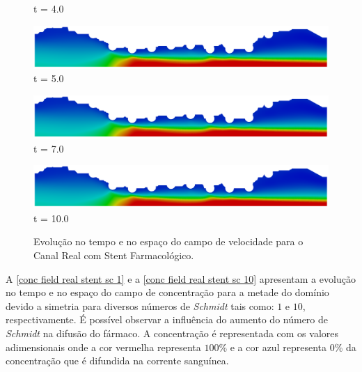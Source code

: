 \begin{figure}[H]
\begin{minipage}{.50\linewidth}
      t = 4.0
     \end{minipage}%
     \begin{minipage}{.50\linewidth}
      \centering
      \includegraphics[scale=0.12]{./02_chaps/cap_solution/figure/vel_RealStrut10000.png}\\
      t = 5.0
     \end{minipage}
     \begin{minipage}{.50\linewidth}
     \medskip
      \centering
      \includegraphics[scale=0.12]{./02_chaps/cap_solution/figure/vel_RealStrut14000.png}\\
      t = 7.0
     \end{minipage}%
     \begin{minipage}{.50\linewidth}
     \medskip
      \centering
      \includegraphics[scale=0.12]{./02_chaps/cap_solution/figure/vel_RealStrut20000.png}\\
      t = 10.0
     \end{minipage}
     \medskip
     \caption{Evolução no tempo e no espaço do campo de velocidade para o Canal Real com Stent Farmacológico.}
     \label{velocity field real stent}
\end{figure}

\vspace{1cm}
A \ref{conc field real stent sc 1} e a \ref{conc field real stent sc 10} 
apresentam a evolução no tempo e no espaço
do campo de concentração para a metade do domínio devido a simetria para diversos números de \textit{Schmidt}
tais como: $1$ e $10$, respectivamente. É possível observar a influência
do aumento do número de \textit{Schmidt} na difusão do fármaco.
A concentração é representada com os valores adimensionais
onde a cor vermelha representa $100$\% e a cor azul representa $0$\% 
da concentração que é difundida na corrente sanguínea. 


